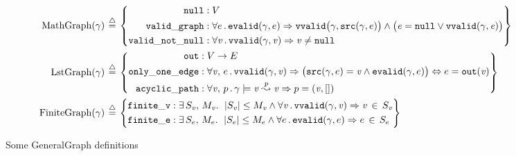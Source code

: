 \begin{figure}
{\footnotesize
\begin{align*}
  \mathrm{MathGraph}(\gamma)\,& \mathbin{\stackrel{\triangle}{=}} \,\left\{
  \begin{aligned}
    \mathtt{null}:&\; V\\
    \mathtt{valid\_graph}:&\;
    \forall e\,.\,\mathtt{evalid}(\gamma, e) \Rightarrow
      \mathtt{vvalid}\big(\gamma, \mathtt{src}(\gamma, e)\big)\wedge
      \big(\mathit{e} = \mathtt{null} \vee \mathtt{vvalid}(\gamma, \mathit{e})\big)\\
    \mathtt{valid\_not\_null}:&\; \forall \mathit{v}\,.\,\mathtt{vvalid}(\gamma, \mathit{v})
    \Rightarrow \mathit{v} \neq \mathtt{null}
  \end{aligned} \right\}\\
  \mathrm{LstGraph}(\gamma)\,&\mathbin{\stackrel{\triangle}{=}}\, \left\{
  \begin{aligned}
    \mathtt{out}:&\; V \rightarrow E\\
    \mathtt{only\_one\_edge}:&\;
    \forall \mathit{v},\,e\,.\,\mathtt{vvalid}(\gamma, \mathit{v}) \Rightarrow
    \big(\mathtt{src}(\gamma, e) =\mathit{v} \wedge
    \mathtt{evalid}(\gamma, e)\big) \Leftrightarrow e = \mathtt{out}(\mathit{v})\\    
  \mathtt{acyclic\_path}:&\; \forall \mathit{v},\,p\,.\,
  \gamma |= \mathit{v} \overset{p}{\leadsto} \mathit{v} \Rightarrow p = (\mathit{v},[]) \\
  \end{aligned} \right\}\\
  \mathrm{FiniteGraph}(\gamma)\,&\mathbin{\stackrel{\triangle}{=}}\, \left\{
  \begin{aligned}
      \mathtt{finite\_v}:&\;\exists\, S_{\mathit{v}},\, M_{\mathit{v}}.~\;\lvert S_{\mathit{v}}\rvert
      \leq M_{\mathit{v}} \wedge
      \forall \mathit{v}\,.\, \mathtt{vvalid}(\gamma,\mathit{v})\Rightarrow \mathit{v}\,\in\,S_{\mathit{v}}\\
      \mathtt{finite\_e}:&\;\exists\, S_e,\, M_e.~\;\lvert S_e\rvert
      \leq M_e \wedge
      \forall e\,.\, \mathtt{evalid}(\gamma,e)\Rightarrow e\,\in\,S_e\\
  \end{aligned}  \right\}\\
\end{align*}}
\vspace*{-3em}
\caption{Some GeneralGraph definitions}
\label{fig:gengraphdefs}
\vspace{-1.5em}

\end{figure} 

